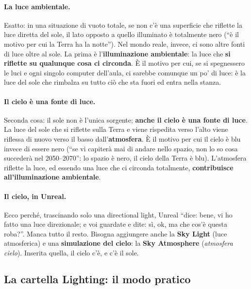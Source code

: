 \paragraph{La luce ambientale.} Esatto: in una situazione di vuoto totale, se
non c'è una superficie che riflette la luce diretta del sole, il lato opposto a
quello illuminato è totalmente nero (``è il motivo per cui la Terra ha la
notte''). Nel mondo reale, invece, ci sono altre fonti di luce oltre al sole. La
prima è l'\textbf{illuminazione ambientale}: la luce che \textbf{si riflette su
qualunque cosa ci circonda}. È il motivo per cui, se si spegnessero le luci e
ogni singolo computer dell'aula, ci sarebbe comunque un po' di luce: è la luce
del sole che rimbalza su tutto ciò che sta fuori ed entra nella stanza.

\paragraph{Il cielo è una fonte di luce.} Seconda cosa: il sole non è l'unica
sorgente; \textbf{anche il cielo è una fonte di luce}. La luce del sole che si
riflette sulla Terra e viene rispedita verso l'alto viene riflessa di nuovo verso
il basso dall'\textbf{atmosfera}. È il motivo per cui il cielo è blu invece di
essere nero (``se vi capiterà mai di andare nello spazio, non lo so cosa
succederà nel 2050--2070'': lo spazio è nero, il cielo della Terra è blu).
L'atmosfera riflette la luce, ed essendo una luce che ci circonda totalmente,
\textbf{contribuisce all'illuminazione ambientale}.

\paragraph{Il cielo, in Unreal.} Ecco perché, trascinando solo una directional
light, Unreal ``dice: bene, vi ho fatto una luce direzionale; e voi guardate e
dite: sì, ok, ma che cos'è questa roba?''. Manca tutto il resto. Bisogna
aggiungere anche la \textbf{Sky Light} (luce atmosferica) e una
\textbf{simulazione del cielo}: la \textbf{Sky Atmosphere} (\emph{atmosfera
cielo}). Inserita quella, il cielo c'è, e c'è il sole.

\subsection{La cartella Lighting: il modo pratico}


